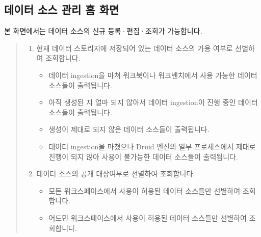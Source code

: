 \documentclass[letterpaper,10pt,english]{sphinxmanual}
\begin{document}
\subsection{데이터 소스 관리 홈 화면}
\label{\detokenize{discovery/part02/manage_data_sources:id1}}\label{\detokenize{discovery/part02/manage_data_sources::doc}}
본 화면에서는 데이터 소스의 신규 등록·편집·조회가 가능합니다.
\begin{quote}

\begin{figure}[H]
\centering

\noindent{}
\end{figure}
\begin{enumerate}
\def\theenumi{\arabic{enumi}}
\def\labelenumi{\theenumi .}
\makeatletter\def\p@enumii{\p@enumi \theenumi .}\makeatother
\item {} 
 현재 데이터 스토리지에 저장되어 있는 데이터 소스의 가용 여부로 선별하여 조회합니다.
\begin{itemize}
\item {} 
 데이터 ingestion을 마쳐 워크북이나 워크벤치에서 사용 가능한 데이터 소스들이 출력됩니다.

\item {} 
 아직 생성된 지 얼마 되지 않아서 데이터 ingestion이 진행 중인 데이터 소스들이 출력됩니다.

\item {} 
 생성이 제대로 되지 않은 데이터 소스들이 출력됩니다.

\item {} 
 데이터 ingestion을 마쳤으나 Druid 엔진의 일부 프로세스에서 제대로 진행이 되지 않아 사용이 불가능한 데이터 소스들이 출력됩니다.

\end{itemize}

\item {} 
 데이터 소스의 공개 대상여부로 선별하여 조회합니다.
\begin{itemize}
\item {} 
 모든 워크스페이스에서 사용이 허용된 데이터 소스들만 선별하여 조회합니다.

\item {} 
 어드민 워크스페이스에서 사용이 허용된 데이터 소스들만 선별하여 조회합니다.


\end{itemize}
\end{enumerate}
\end{quote}
\end{document}
